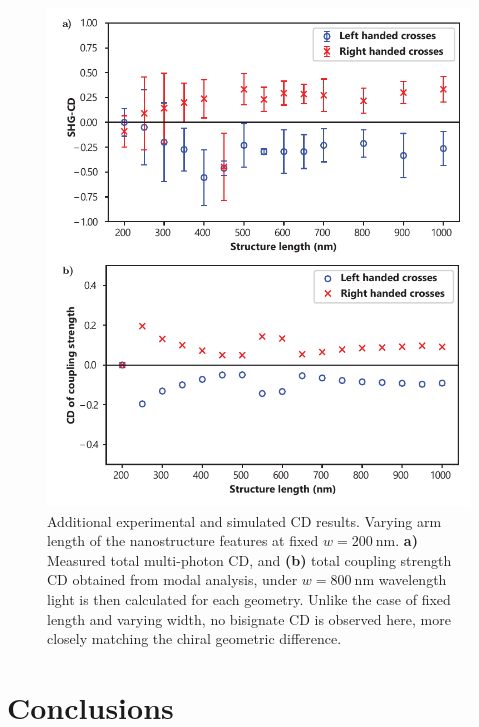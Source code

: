 \begin{figure}[htb!]	
    \centering	
    \includegraphics[scale=1]{./figures/results/EnantiomorphingChiralCrosses/d200data.pdf}
    \caption{\label{fig:results:EnantiomorphingChiralCrosses:d200data}
    Additional experimental and simulated CD results. Varying arm length of the nanostructure features at fixed $w=\SI{200}{\nano\m}$. \textbf{a)} Measured total multi-photon CD, and \textbf{(b)} total coupling strength CD obtained from modal analysis, under $w=\SI{800}{\nano\m}$ wavelength light is then calculated for each geometry. Unlike the case of fixed length and varying width, no bisignate CD is observed here, more closely matching the chiral geometric difference.}
\end{figure}

\section{Conclusions}\label{sec:results:EnantiomorphingChiralCrosses:conclusions}

